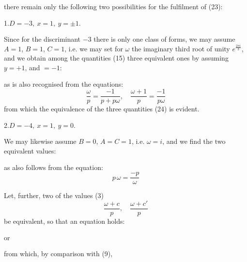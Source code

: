 there remain only the following two possibilities for the fulfilment of (23):

1.\quad $D=-3, \ x=1, \ y=\pm 1.$

Since for the discriminant $-3$ there is only one class of forms, we may assume $A=1$, $B=1$, $C=1$, i.e. we may set for $\omega$ the imaginary third root of unity $e^{\frac{2\pi i}{3}}$, and we obtain among the quantities (15) three equivalent ones by assuming $y=+1$, and $=-1$: %


as is also recognised from the equations:
\[
\frac{\omega}{p} = \frac{-1}{p+p\omega}, \quad \frac{\omega+1}{p} = \frac{-1}{p\omega}
\]
from which the equivalence of the three quantities (24) is evident.

2.\quad $D=-4, \ x=1, \ y=0.$

We may likewise assume $B=0$, $A=C=1$, i.e. $\omega=i$, and we find the two equivalent values:


as also follows from the equation:
\[
p\,\omega = \frac{-p}{\omega}
\]

Let, further, two of the values (3) %
\[
\frac{\omega+c}{p}, \quad \frac{\omega+c'}{p}
\]
be equivalent, so that an equation holds:


or


from which, by comparison with (9),

